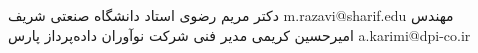 \begin{referees}
    {دکتر مریم رضوی}
    {استاد}
    {دانشگاه صنعتی شریف}
    {m.razavi@sharif.edu}
    {}
    {مهندس امیرحسین کریمی}
    {مدیر فنی }
    {شرکت نوآوران داده‌پرداز پارس}
    {a.karimi@dpi-co.ir}
\end{referees}
